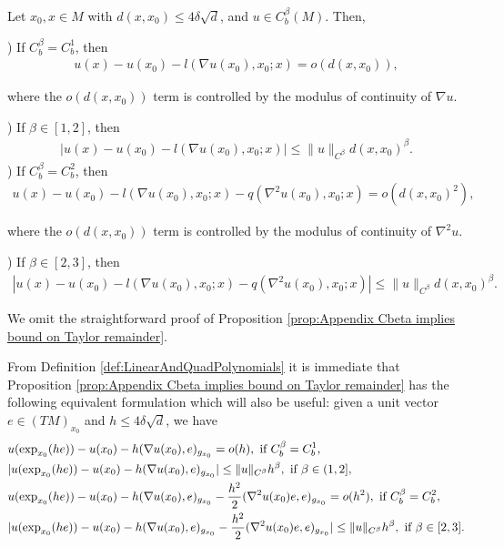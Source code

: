 \documentclass[11pt,reqno]{amsart}
\numberwithin{equation}{section}
\theoremstyle{plain}
\begin{document}
\begin{prop}\label{prop:Appendix Cbeta implies bound on Taylor remainder}
  Let $x_0,x \in M$ with $d(x,x_0)\leq 4\delta\sqrt{d}$, and $u \in C^\beta_b(M)$. Then,
  
  ) If $C^{\beta}_b=C^1_b$, then
  \begin{align*}	
    u(x)-u(x_0)-l(\nabla u(x_0),x_0;x) = o(d(x,x_0)),
  \end{align*}

  where the $o(d(x,x_0))$ term is controlled by the modulus of continuity of $\nabla u$.
  
  ) If $\beta \in [1,2]$, then
  \begin{align*}	
    |u(x)-u(x_0)-l(\nabla u(x_0),x_0;x)|\leq \|u\|_{C^\beta}d(x,x_0)^\beta.
  \end{align*}	  
  ) If $C^\beta_b = C^2_b$, then
  \begin{align*}
    u(x)-u(x_0)-l(\nabla u(x_0),x_0;x)-q(\nabla^2u(x_0),x_0;x) = o(d(x,x_0)^2),
  \end{align*}

   where the $o(d(x,x_0))$ term is controlled by the modulus of continuity of $\nabla^2 u$.
 
  ) If $\beta \in [2,3]$, then
  \begin{align*}	
    |u(x)-u(x_0)-l(\nabla u(x_0),x_0;x)-q(\nabla^2u(x_0),x_0;x)|\leq \|u\|_{C^\beta}d(x,x_0)^\beta.
  \end{align*}	  
\end{prop}

We omit the straightforward proof of Proposition \ref{prop:Appendix Cbeta implies bound on Taylor remainder}.

\begin{rem}\label{rem:ExpansionInEXPEst}
  From Definition \ref{def:LinearAndQuadPolynomials} it is immediate that Proposition \ref{prop:Appendix Cbeta implies bound on Taylor remainder} has the following equivalent formulation which will also be useful: given a unit vector $e \in (TM)_{x_0}$ and $h\leq 4\delta \sqrt{d}$, we have
  \begin{align*}
    & u(\exp_{x_0}(he))-u(x_0)-h(\nabla u(x_0),e)_{g_{x_0}} = o(h), \textnormal{ if } C^\beta_b = C^1_b,\\	  
    & |u(\exp_{x_0}(he))-u(x_0)-h(\nabla u(x_0),e)_{g_{x_0}}|\leq \|u\|_{C^\beta}h^{\beta}, \textnormal{ if } \beta \in (1,2],\\
    & u(\exp_{x_0}(he))-u(x_0)-h(\nabla u(x_0),e)_{g_{x_0}}-\frac{h^2}{2}(\nabla^2 u(x_0)e,e)_{g_{x_0}} = o(h^2), \textnormal{ if } C^\beta_b = C^2_b,\\	
    & |u(\exp_{x_0}(he))-u(x_0)-h(\nabla u(x_0),e)_{g_{x_0}}-\frac{h^2}{2}(\nabla^2 u(x_0)e,e)_{g_{x_0}}|\leq \|u\|_{C^\beta}h^{\beta}, \textnormal{ if } \beta \in [2,3].	
  \end{align*}
\end{rem}
 
\end{document}
